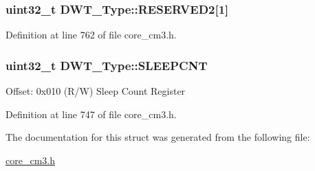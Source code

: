 \subsubsection[{\texorpdfstring{R\+E\+S\+E\+R\+V\+E\+D2}{RESERVED2}}]{\setlength{\rightskip}{0pt plus 5cm}uint32\+\_\+t D\+W\+T\+\_\+\+Type\+::\+R\+E\+S\+E\+R\+V\+E\+D2\mbox{[}1\mbox{]}}\hypertarget{structDWT__Type_a8556ca1c32590517602d92fe0cd55738}{}\label{structDWT__Type_a8556ca1c32590517602d92fe0cd55738}


Definition at line 762 of file core\+\_\+cm3.\+h.

\subsubsection[{\texorpdfstring{S\+L\+E\+E\+P\+C\+NT}{SLEEPCNT}}]{ uint32\+\_\+t D\+W\+T\+\_\+\+Type\+::\+S\+L\+E\+E\+P\+C\+NT}\hypertarget{structDWT__Type_a8afd5a4bf994011748bc012fa442c74d}{}\label{structDWT__Type_a8afd5a4bf994011748bc012fa442c74d}
Offset\+: 0x010 (R/W) Sleep Count Register 

Definition at line 747 of file core\+\_\+cm3.\+h.



The documentation for this struct was generated from the following file\+:\begin{DoxyCompactItemize}
\item 
\hyperlink{core__cm3_8h}{core\+\_\+cm3.\+h}\end{DoxyCompactItemize}
